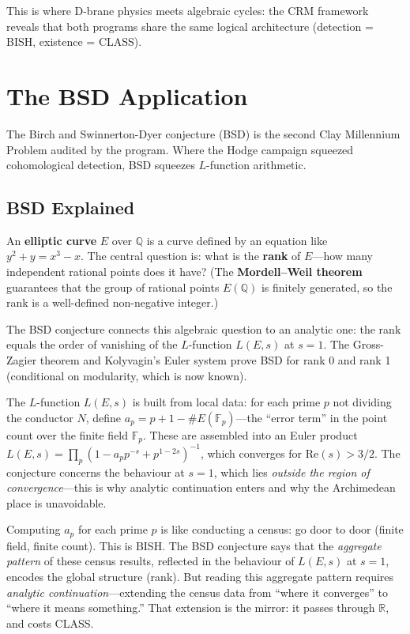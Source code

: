 \documentclass[11pt,twoside,openany]{report}
\theoremstyle{remark}
\newcommand{\BISH}{\textsf{BISH}}
\newcommand{\CLASS}{\textsf{CLASS}}
\begin{document}
This is where D-brane physics meets algebraic cycles: the CRM framework reveals that both programs share the same logical architecture (detection = \BISH, existence = \CLASS).


\chapter{The BSD Application}

The Birch and Swinnerton-Dyer conjecture (BSD) is the second Clay Millennium Problem audited by the program. Where the Hodge campaign squeezed cohomological detection, BSD squeezes $L$-function arithmetic.


\section{BSD Explained}

An \textbf{elliptic curve} $E$ over $\mathbb{Q}$ is a curve defined by an equation like $y^2 + y = x^3 - x$. The central question is: what is the \textbf{rank} of $E$---how many independent rational points does it have? (The \textbf{Mordell--Weil theorem} guarantees that the group of rational points $E(\mathbb{Q})$ is finitely generated, so the rank is a well-defined non-negative integer.)

The BSD conjecture connects this algebraic question to an analytic one: the rank equals the order of vanishing of the $L$-function $L(E,s)$ at $s = 1$. The Gross-Zagier theorem and Kolyvagin's Euler system prove BSD for rank 0 and rank 1 (conditional on modularity, which is now known).

The $L$-function $L(E,s)$ is built from local data: for each prime $p$ not dividing the conductor $N$, define $a_p = p + 1 - \#E(\mathbb{F}_p)$---the ``error term'' in the point count over the finite field $\mathbb{F}_p$. These are assembled into an Euler product $L(E,s) = \prod_p (1 - a_p p^{-s} + p^{1-2s})^{-1}$, which converges for $\mathrm{Re}(s) > 3/2$. The conjecture concerns the behaviour at $s = 1$, which lies \emph{outside the region of convergence}---this is why analytic continuation enters and why the Archimedean place is unavoidable.

\begin{analogybox}
Computing $a_p$ for each prime $p$ is like conducting a census: go door to door (finite field, finite count). This is \BISH. The BSD conjecture says that the \emph{aggregate pattern} of these census results, reflected in the behaviour of $L(E,s)$ at $s = 1$, encodes the global structure (rank). But reading this aggregate pattern requires \emph{analytic continuation}---extending the census data from ``where it converges'' to ``where it means something.'' That extension is the mirror: it passes through $\mathbb{R}$, and costs \CLASS.
\end{analogybox}
\end{document}
